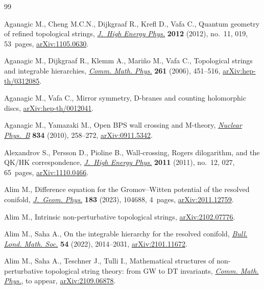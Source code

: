 \documentclass[pdftex]{sigma}
\numberwithin{equation}{section}
\begin{document}
\begin{thebibliography}{99}
\footnotesize\itemsep=0pt

Aganagic M., Cheng M.C.N., Dijkgraaf R., Krefl D., Vafa C., Quantum geometry of
 refined topological strings, \href{https://doi.org/10.1007/JHEP11(2012)019}{\textit{J.~High Energy Phys.}} \textbf{2012}
 (2012), no.~11, 019, 53~pages, \href{https://arxiv.org/abs/1105.0630}{arXiv:1105.0630}.

Aganagic M., Dijkgraaf R., Klemm A., Mari\~no M., Vafa C., Topological strings
 and integrable hierarchies, \href{https://doi.org/10.1007/s00220-005-1448-9}{\textit{Comm. Math. Phys.}} \textbf{261} (2006),
 451--516, \href{https://arxiv.org/abs/hep-th/0312085}{arXiv:hep-th/0312085}.

Aganagic M., Vafa C., Mirror symmetry, {D}-branes and counting holomorphic
 discs, \href{https://arxiv.org/abs/hep-th/0012041}{arXiv:hep-th/0012041}.

Aganagic M., Yamazaki M., Open {BPS} wall crossing and {M}-theory,
 \href{https://doi.org/10.1016/j.nuclphysb.2010.03.019}{\textit{Nuclear Phys.~B}} \textbf{834} (2010), 258--272, \href{https://arxiv.org/abs/0911.5342}{arXiv:0911.5342}.

Alexandrov S., Persson D., Pioline B., Wall-crossing, {R}ogers dilogarithm, and
 the {QK}/{HK} correspondence, \href{https://doi.org/10.1007/JHEP12(2011)027}{\textit{J.~High Energy Phys.}} \textbf{2011}
 (2011), no.~12, 027, 65~pages, \href{https://arxiv.org/abs/1110.0466}{arXiv:1110.0466}.

Alim M., Difference equation for the {G}romov--{W}itten potential of the
 resolved conifold, \href{https://doi.org/10.1016/j.geomphys.2022.104688}{\textit{J.~Geom. Phys.}} \textbf{183} (2023), 104688,
 4~pages, \href{https://arxiv.org/abs/2011.12759}{arXiv:2011.12759}.

Alim M., Intrinsic non-perturbative topological strings, \href{https://arxiv.org/abs/2102.07776}{arXiv:2102.07776}.

Alim M., Saha A., On the integrable hierarchy for the resolved conifold,
 \href{https://doi.org/10.1112/blms.12676}{\textit{Bull. Lond. Math. Soc.}} \textbf{54} (2022), 2014--2031,
 \href{https://arxiv.org/abs/2101.11672}{arXiv:2101.11672}.

Alim M., Saha A., Teschner J., Tulli I., Mathematical structures of
 non-perturbative topological string theory: from {GW} to {DT} invariants,
 \href{https://doi.org/10.1007/s00220-022-04571-y}{\textit{Comm. Math. Phys.}}, {t}o appear, \href{https://arxiv.org/abs/2109.06878}{arXiv:2109.06878}.


\end{thebibliography}
\end{document}

